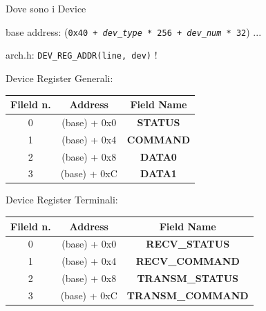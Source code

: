 \documentclass{beamer}
\begin{document}
\begin{frame}{Dove sono i Device}

base address: (\texttt{0x40 + \emph{dev\_type} * 256 + \emph{dev\_num} * 32}) ...
\vspace{5px}

arch.h: \texttt{DEV\_REG\_ADDR(line, dev)} !

\vfill

Device Register Generali:
	
{	\small
	\begin{tabular}{|c|c|c|}
		\hline
		Fileld n. & Address & Field Name \\
		\hline
		\hline
		0 & (base) + 0x0 & \textbf{STATUS}\\
		\hline
		1 & (base) + 0x4 & \textbf{COMMAND} \\
		\hline
		2 & (base) + 0x8 & \textbf{DATA0} \\
		\hline
		3 & (base) + 0xC & \textbf{DATA1} \\
		\hline
	\end{tabular}
}

\vfill

Device Register Terminali:

{	\small
	\begin{tabular}{|c|c|c|}
			\hline
			Fileld n. & Address & Field Name \\
			\hline
			\hline
			0 & (base) + 0x0 & \textbf{RECV\_STATUS}\\
			\hline
			1 & (base) + 0x4 & \textbf{RECV\_COMMAND} \\
			\hline
			2 & (base) + 0x8 & \textbf{TRANSM\_STATUS} \\
			\hline
			3 & (base) + 0xC & \textbf{TRANSM\_COMMAND} \\
			\hline
		\end{tabular}
}
\end{frame}
\end{document}
